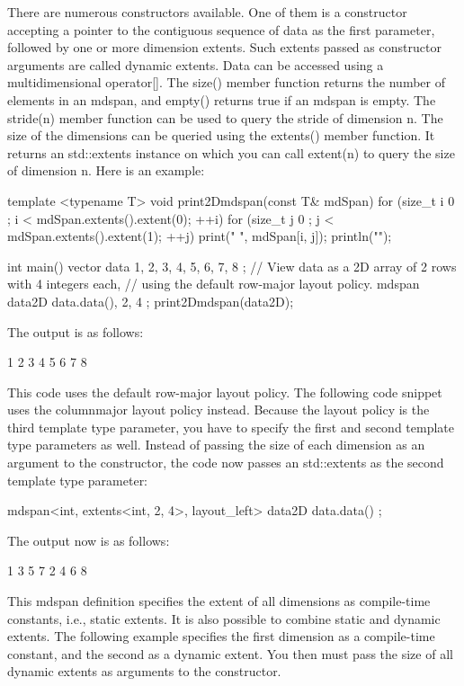 There are numerous constructors available. One of them is a constructor accepting a pointer to the contiguous sequence of data as the first parameter, followed by one or more dimension extents. Such extents passed as constructor arguments are called dynamic extents. Data can be accessed using a multidimensional operator[]. The size() member function returns the number of elements in an mdspan, and empty() returns true if an mdspan is empty. The stride(n) member function can be used to query the stride of dimension n. The size of the dimensions can be queried using the extents() member function. It returns an std::extents instance on which you can call extent(n) to query the size of dimension n. Here is an example:

\begin{cpp}
template <typename T> void print2Dmdspan(const T& mdSpan)
{
    for (size_t i { 0 }; i < mdSpan.extents().extent(0); ++i) {
        for (size_t j { 0 }; j < mdSpan.extents().extent(1); ++j) {
            print("{} ", mdSpan[i, j]);
        }
        println("");
    }
}

int main()
{
    vector data { 1, 2, 3, 4, 5, 6, 7, 8 };
    // View data as a 2D array of 2 rows with 4 integers each,
    // using the default row-major layout policy.
    mdspan data2D { data.data(), 2, 4 };
    print2Dmdspan(data2D);
}
\end{cpp}

The output is as follows:

\begin{shell}
1 2 3 4
5 6 7 8
\end{shell}

This code uses the default row-major layout policy. The following code snippet uses the columnmajor layout policy instead. Because the layout policy is the third template type parameter, you have to specify the first and second template type parameters as well. Instead of passing the size of each dimension as an argument to the constructor, the code now passes an std::extents as the second template type parameter:

\begin{cpp}
mdspan<int, extents<int, 2, 4>, layout_left> data2D { data.data() };
\end{cpp}

The output now is as follows:

\begin{shell}
1 3 5 7
2 4 6 8
\end{shell}

This mdspan definition specifies the extent of all dimensions as compile-time constants, i.e., static extents. It is also possible to combine static and dynamic extents. The following example specifies the first dimension as a compile-time constant, and the second as a dynamic extent. You then must pass the size of all dynamic extents as arguments to the constructor.

